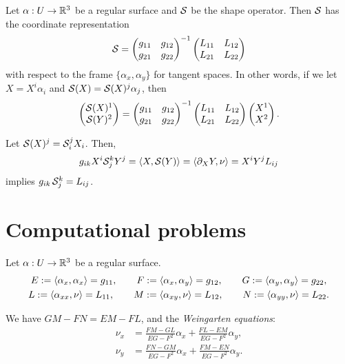 \documentclass{../note}
\def\a{\alpha}
\begin{document}
\begin{thm}
Let $\a:U\to\R^3$ be a regular surface and $\mathcal{S}$ be the shape operator.
Then $\mathcal{S}$ has the coordinate representation
\[\mathcal{S}=\begin{pmatrix}g_{11}&g_{12}\\g_{21}&g_{22}\end{pmatrix}^{-1}\begin{pmatrix}L_{11}&L_{12}\\L_{21}&L_{22}\end{pmatrix}\]
with respect to the frame $\{\a_x,\a_y\}$ for tangent spaces.
In other words, if we let $X=X^i\a_i$ and $\cS(X)=\cS(X)^j\a_j$, then
\[\begin{pmatrix}\mathcal{S}(X)^1\\\mathcal{S}(Y)^2\end{pmatrix}=\begin{pmatrix}g_{11}&g_{12}\\g_{21}&g_{22}\end{pmatrix}^{-1}\begin{pmatrix}L_{11}&L_{12}\\L_{21}&L_{22}\end{pmatrix}\begin{pmatrix}X^1\\X^2\end{pmatrix}.\]
\end{thm}
\begin{pf}
Let $\mathcal{S}(X)^j=\mathcal{S}_i^jX_i$.
Then,
\[g_{ik}X^i\cS_j^kY^j=\<X,\cS(Y)\>=\<\pd_XY,\nu\>=X^iY^jL_{ij}\]
implies $g_{ik}\,\mathcal{S}_j^k=L_{ij}$.
\end{pf}






\section{Computational problems}

\begin{defn}
Let $\a:U\to\R^3$ be a regular surface.
\begin{gather*}
E:=\<\a_x,\a_x\>=g_{11},\qquad F:=\<\a_x,\a_y\>=g_{12},\qquad G:=\<\a_y,\a_y\>=g_{22},\\
L:=\<\a_{xx},\nu\>=L_{11},\qquad M:=\<\a_{xy},\nu\>=L_{12},\qquad N:=\<\a_{yy},\nu\>=L_{22}.
\end{gather*}
\end{defn}


\begin{cor}
We have $GM-FN=EM-FL$, and the \emph{Weingarten equations}:
\begin{align*}
\nu_x&=\frac{FM-GL}{EG-F^2}\a_x+\frac{FL-EM}{EG-F^2}\a_y,\\
\nu_y&=\frac{FN-GM}{EG-F^2}\a_x+\frac{FM-EN}{EG-F^2}\a_y.
\end{align*}
\end{cor}
\end{document}
